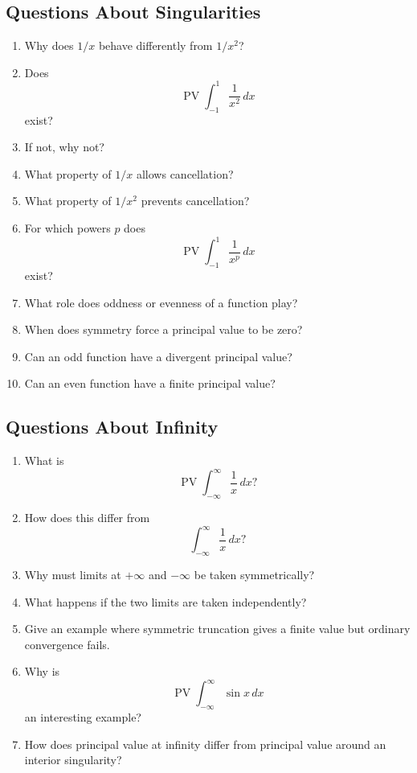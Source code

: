 \subsection{Questions About Singularities}

\begin{enumerate}[resume]
  \item Why does \(1/x\) behave differently from \(1/x^2\)?
  \item Does
    \[
      \operatorname{PV}\int_{-1}^{1}\frac{1}{x^2}\,dx
    \]
    exist?
  \item If not, why not?
  \item What property of \(1/x\) allows cancellation?
  \item What property of \(1/x^2\) prevents cancellation?
  \item For which powers \(p\) does
    \[
      \operatorname{PV}\int_{-1}^{1}\frac{1}{x^p}\,dx
    \]
    exist?
  \item What role does oddness or evenness of a function play?
  \item When does symmetry force a principal value to be zero?
  \item Can an odd function have a divergent principal value?
  \item Can an even function have a finite principal value?
\end{enumerate}

\subsection{Questions About Infinity}

\begin{enumerate}[resume]
  \item What is
    \[
      \operatorname{PV}\int_{-\infty}^{\infty}\frac{1}{x}\,dx?
    \]
  \item How does this differ from
    \[
      \int_{-\infty}^{\infty}\frac{1}{x}\,dx?
    \]
  \item Why must limits at \(+\infty\) and \(-\infty\) be taken symmetrically?
  \item What happens if the two limits are taken independently?
  \item Give an example where symmetric truncation gives a finite value but ordinary convergence fails.
  \item Why is
    \[
      \operatorname{PV}\int_{-\infty}^{\infty}\sin x\,dx
    \]
    an interesting example?
  \item How does principal value at infinity differ from principal value around an interior singularity?
\end{enumerate}

